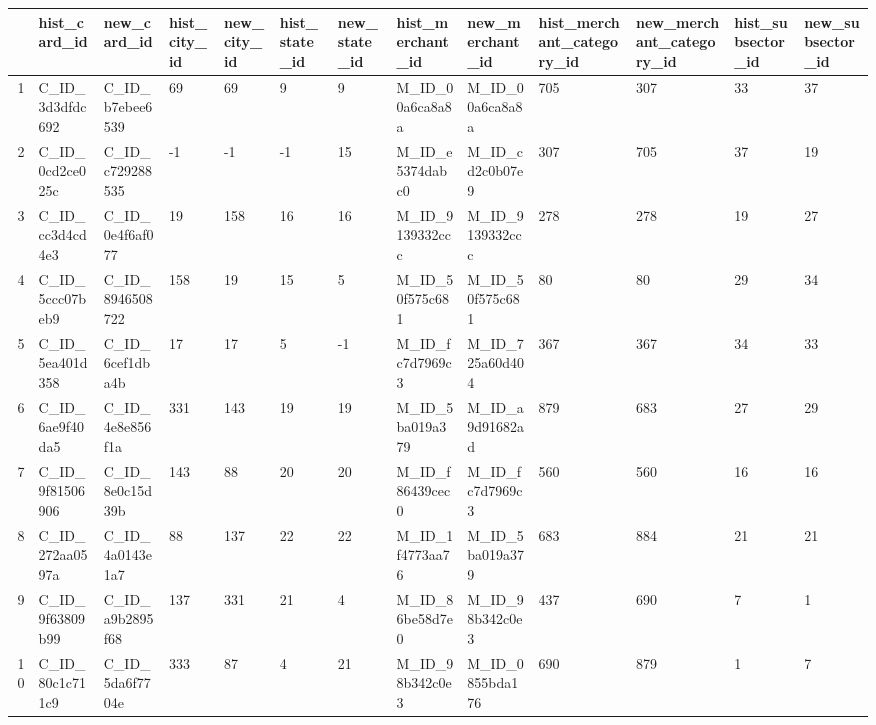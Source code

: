 \begin{table}[ht]
\centering
\begin{tabular}{rllllllllllll}
  \hline
 & hist\_card\_id & new\_card\_id & hist\_city\_id & new\_city\_id & hist\_state\_id & new\_state\_id & hist\_merchant\_id & new\_merchant\_id & hist\_merchant\_category\_id & new\_merchant\_category\_id & hist\_subsector\_id & new\_subsector\_id \\ 
  \hline
1 & C\_ID\_3d3dfdc692 & C\_ID\_b7ebee6539 & 69 & 69 & 9 & 9 & M\_ID\_00a6ca8a8a & M\_ID\_00a6ca8a8a & 705 & 307 & 33 & 37 \\ 
  2 & C\_ID\_0cd2ce025c & C\_ID\_c729288535 & -1 & -1 & -1 & 15 & M\_ID\_e5374dabc0 & M\_ID\_cd2c0b07e9 & 307 & 705 & 37 & 19 \\ 
  3 & C\_ID\_cc3d4cd4e3 & C\_ID\_0e4f6af077 & 19 & 158 & 16 & 16 & M\_ID\_9139332ccc & M\_ID\_9139332ccc & 278 & 278 & 19 & 27 \\ 
  4 & C\_ID\_5ccc07beb9 & C\_ID\_8946508722 & 158 & 19 & 15 & 5 & M\_ID\_50f575c681 & M\_ID\_50f575c681 & 80 & 80 & 29 & 34 \\ 
  5 & C\_ID\_5ea401d358 & C\_ID\_6cef1dba4b & 17 & 17 & 5 & -1 & M\_ID\_fc7d7969c3 & M\_ID\_725a60d404 & 367 & 367 & 34 & 33 \\ 
  6 & C\_ID\_6ae9f40da5 & C\_ID\_4e8e856f1a & 331 & 143 & 19 & 19 & M\_ID\_5ba019a379 & M\_ID\_a9d91682ad & 879 & 683 & 27 & 29 \\ 
  7 & C\_ID\_9f81506906 & C\_ID\_8e0c15d39b & 143 & 88 & 20 & 20 & M\_ID\_f86439cec0 & M\_ID\_fc7d7969c3 & 560 & 560 & 16 & 16 \\ 
  8 & C\_ID\_272aa0597a & C\_ID\_4a0143e1a7 & 88 & 137 & 22 & 22 & M\_ID\_1f4773aa76 & M\_ID\_5ba019a379 & 683 & 884 & 21 & 21 \\ 
  9 & C\_ID\_9f63809b99 & C\_ID\_a9b2895f68 & 137 & 331 & 21 & 4 & M\_ID\_86be58d7e0 & M\_ID\_98b342c0e3 & 437 & 690 & 7 & 1 \\ 
  10 & C\_ID\_80c1c711c9 & C\_ID\_5da6f7704e & 333 & 87 & 4 & 21 & M\_ID\_98b342c0e3 & M\_ID\_0855bda176 & 690 & 879 & 1 & 7 \\ 
   \hline
\end{tabular}
\end{table}

